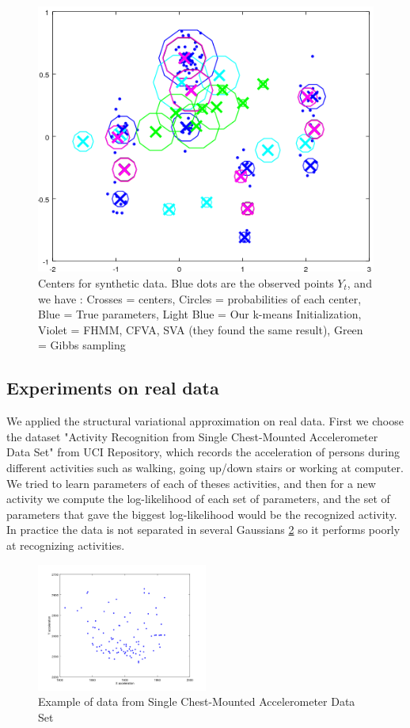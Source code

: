 \documentclass{article}
\begin{document}
\begin{figure}[h]
	\centering
	\includegraphics[width=1.0\textwidth]{fig11.png}
	\caption{Centers for synthetic data. Blue dots are the observed points $Y_t$, and we have : Crosses = centers, Circles = probabilities of each center, Blue = True parameters, Light Blue = Our k-means Initialization, Violet = FHMM, CFVA, SVA (they found the same result), Green = Gibbs sampling}
	\label{fig6}
\end{figure}

\subsection{Experiments on real data}

We applied the structural variational approximation on real data. First we choose the dataset "Activity Recognition from Single Chest-Mounted Accelerometer Data Set" from UCI Repository, which records the acceleration of persons during different activities such as walking, going up/down stairs or working at computer. We tried to learn parameters of each of theses activities, and then for a new activity we compute the log-likelihood of each set of parameters, and the set of parameters that gave the biggest log-likelihood would be the recognized activity. In practice the data is not separated in several Gaussians \ref{fig5} so it performs poorly at recognizing activities.

\begin{figure}[h]
	\centering
	\includegraphics[width=0.5\textwidth]{standing.png}
	\caption{Example of data from Single Chest-Mounted Accelerometer Data Set}
	\label{fig5}
\end{figure}
\end{document}
